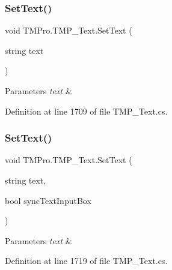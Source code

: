 \subsubsection{\texorpdfstring{SetText()}{SetText()}\hspace{0.1cm}{\footnotesize\ttfamily [1/6]}}
{\footnotesize\ttfamily void T\+M\+Pro.\+T\+M\+P\+\_\+\+Text.\+Set\+Text (\begin{DoxyParamCaption}\item[{string}]{text }\end{DoxyParamCaption})}






\begin{DoxyParams}{Parameters}
{\em text} & \\
\hline
\end{DoxyParams}


Definition at line 1709 of file T\+M\+P\+\_\+\+Text.\+cs.

\mbox{\label{class_t_m_pro_1_1_t_m_p___text_a3cd8800ec9be3e3b07c06115a127278e}} 
\subsubsection{\texorpdfstring{SetText()}{SetText()}\hspace{0.1cm}{\footnotesize\ttfamily [2/6]}}
{\footnotesize\ttfamily void T\+M\+Pro.\+T\+M\+P\+\_\+\+Text.\+Set\+Text (\begin{DoxyParamCaption}\item[{string}]{text,  }\item[{bool}]{sync\+Text\+Input\+Box }\end{DoxyParamCaption})}






\begin{DoxyParams}{Parameters}
{\em text} & \\
\hline
\end{DoxyParams}


Definition at line 1719 of file T\+M\+P\+\_\+\+Text.\+cs.

\mbox{\label{class_t_m_pro_1_1_t_m_p___text_a3125f71f9672b9de01b574ac42872955}} 
